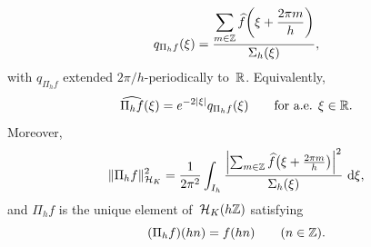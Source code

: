 \begin{theorem}
\begin{enumerate}[label=(\roman*)]
\begin{equation}
      q_{\Pi_hf}(\xi)
      =\frac{\displaystyle\sum_{m\in\mathbb{Z}}
      \widehat f\!\left(\xi+\frac{2\pi m}{h}\right)}
      {\Sigma_h(\xi)},
      \end{equation}
      with $q_{\Pi_hf}$ extended $2\pi/h$-periodically to~$\mathbb{R}$.
      Equivalently,
      \[
      \widehat{\Pi_hf}(\xi)=e^{-2\lvert \xi\rvert}q_{\Pi_hf}(\xi)
      \qquad\text{for a.e. }\xi\in\mathbb{R}.
      \]
      Moreover,
      \begin{equation}\label{eq:lattice-projection-norm}
      \|\Pi_hf\|_{\mathcal H_K}^2
      =\frac{1}{2\pi^2}\int_{I_h}
      \frac{\left|\sum_{m\in\mathbb{Z}}
      \widehat f\!\left(\xi+\frac{2\pi m}{h}\right)\right|^2}
      {\Sigma_h(\xi)}\,\,\mathrm{d}\xi,
      \end{equation}
      and $\Pi_hf$ is the unique element of~$\mathcal H_K(h\mathbb{Z})$
      satisfying
      \[
      (\Pi_hf)(hn)=f(hn)
      \qquad(n\in\mathbb{Z}).
      \]
\end{enumerate}
\end{theorem}

